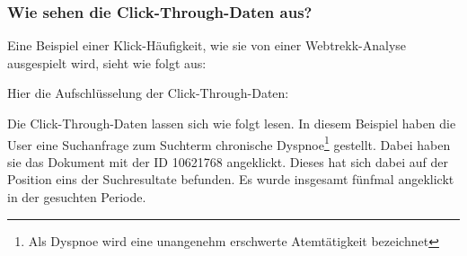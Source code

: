 \subsubsection{Wie sehen die Click-Through-Daten aus?}
\label{sec:Grundlagen:Grundbegriffe:Click-Through-Daten:AussehenClick-Through-Daten}

Eine Beispiel einer Klick-Häufigkeit, wie sie von einer Webtrekk-Analyse ausgespielt wird, sieht wie folgt aus:

\begin{table}[H]
\centering
\vspace{-.75em}
\caption[Beispiel Click-Through-Daten]{Beispiel Click-Through-Daten}
\vspace{-.5em}
\label{tab:BeispielCTDaten}
\footnotesize
\renewcommand*{\arraystretch}{1.2}
\vspace{-2em}
\end{table}

Hier die Aufschlüsselung der Click-Through-Daten:

\begin{table}[H]
\centering
\vspace{-.75em}
\caption[Beispielhafte Aufschlüsselung der Click-Through-Daten]{Beispielhafte Aufschlüsselung der Click-Through-Daten}
\label{tab:AufschluesselungCTDaten}
\vspace{-.5em}
\footnotesize
\renewcommand*{\arraystretch}{1.2}
\vspace{-2em}
\end{table}

Die Click-Through-Daten lassen sich wie folgt lesen. In diesem Beispiel haben die User eine Suchanfrage zum Suchterm \glqq chronische Dyspnoe\footnote{Als Dyspnoe wird eine unangenehm erschwerte Atemtätigkeit bezeichnet}\grqq{} gestellt. Dabei haben sie das Dokument mit der ID 10621768 angeklickt. Dieses hat sich dabei auf der Position eins der Suchresultate befunden. Es wurde insgesamt fünfmal angeklickt in der gesuchten Periode. 

